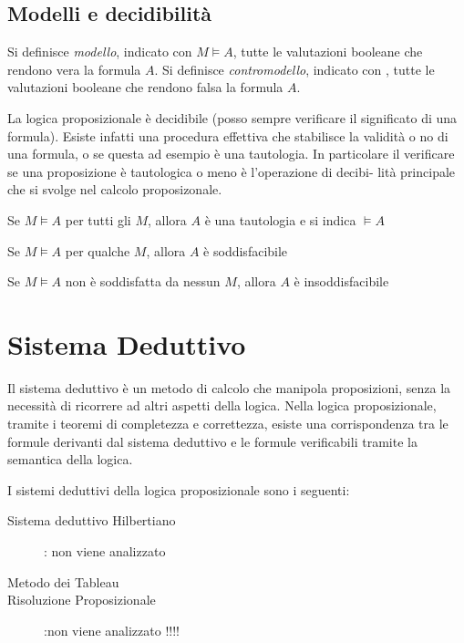 \subsection{Modelli e decidibilità}
Si definisce \emph{modello}, indicato con $M \models A$, tutte le valutazioni booleane
che rendono vera la formula $A$.
Si definisce \emph{contromodello}, indicato con , tutte le valutazioni booleane
che rendono falsa la formula $A$.

La logica proposizionale è decidibile (posso sempre verificare il significato di una formula).
Esiste infatti una procedura effettiva che stabilisce la validità o no di una formula, o se questa
ad esempio è una tautologia.
In particolare il verificare se una proposizione è tautologica o meno è l’operazione di decibi-
lità principale che si svolge nel calcolo proposizonale.

\begin{defi}
    Se $M \models A$ per tutti gli $M$, allora $A$ è una tautologia e si indica $\models A$
\end{defi}

\begin{defi}
    Se $M \models A$ per qualche $M$, allora $A$ è soddisfacibile
\end{defi}

\begin{defi}
Se $M \models A$ non è soddisfatta da nessun $M$, allora $A$ è insoddisfacibile
\end{defi}

\section{Sistema Deduttivo}
Il sistema deduttivo è un metodo di calcolo che manipola proposizioni, senza la
necessità di ricorrere ad altri aspetti della logica.\newline
Nella logica proposizionale, tramite i teoremi di completezza e correttezza, esiste
una corrispondenza tra le formule derivanti dal sistema deduttivo e le formule verificabili
tramite la semantica della logica.

I sistemi deduttivi della logica proposizionale sono i seguenti:
\begin{description}
    \item[Sistema deduttivo Hilbertiano]: non viene analizzato
    \item[Metodo dei Tableau]
    \item [Risoluzione Proposizionale]:non viene analizzato !!!!
\end{description}

